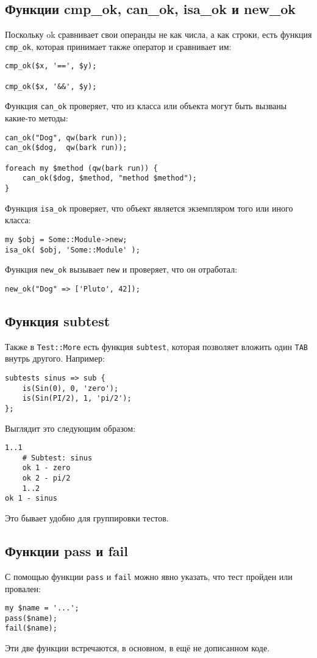 \subsection{Функции cmp\_ok, can\_ok, isa\_ok и new\_ok}
Поскольку ok сравнивает свои операнды не как числа, а как строки, есть функция \verb|cmp_ok|, которая принимает также оператор и сравнивает им:
\begin{verbatim}
cmp_ok($x, '==', $y);

cmp_ok($x, '&&', $y);
\end{verbatim}
Функция \verb|can_ok| проверяет, что из класса или объекта могут быть вызваны какие-то методы:
\begin{verbatim}
can_ok("Dog", qw(bark run));
can_ok($dog,  qw(bark run));

foreach my $method (qw(bark run)) {
	can_ok($dog, $method, "method $method");
}
\end{verbatim}
Функция \verb|isa_ok| проверяет, что объект является экземпляром того или иного класса:
\begin{verbatim}
my $obj = Some::Module->new;
isa_ok( $obj, 'Some::Module' );
\end{verbatim}
Функция \verb|new_ok| вызывает \verb|new| и проверяет, что он отработал:
\begin{verbatim}
new_ok("Dog" => ['Pluto', 42]);
\end{verbatim}

\subsection{Функция subtest}
Также в \verb|Test::More| есть функция \verb|subtest|, которая позволяет вложить один \verb|TAB| внутрь другого. Например:
\begin{verbatim}
subtests sinus => sub {
	is(Sin(0), 0, 'zero');
	is(Sin(PI/2), 1, 'pi/2');
};
\end{verbatim}
Выглядит это следующим образом:
\begin{verbatim}
1..1
	# Subtest: sinus
	ok 1 - zero
	ok 2 - pi/2
	1..2
ok 1 - sinus
\end{verbatim}
Это бывает удобно для группировки тестов.

\subsection{Функции pass и fail}
С помощью функции \verb|pass| и \verb|fail| можно явно указать, что тест пройден или провален:
\begin{verbatim}
my $name = '...';
pass($name);
fail($name);
\end{verbatim}
Эти две функции встречаются, в основном, в ещё не дописанном коде.

